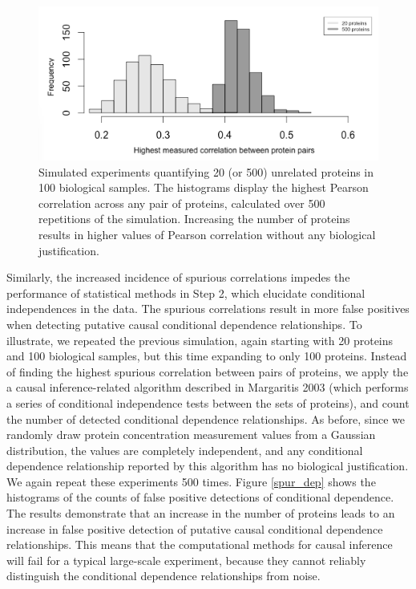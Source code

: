\documentclass[journal=jacsat,manuscript=article]{achemso}
\begin{document}
\begin{figure}[!tpb]
\centerline{\includegraphics[width=1\textwidth]{figs/spurious_corr.png}}
\caption{Simulated experiments quantifying 20 (or 500) unrelated proteins in 100 biological samples. The histograms display the highest Pearson correlation across any pair of proteins, calculated over 500 repetitions of the simulation. Increasing the number of proteins results in higher values of Pearson correlation without any biological justification.}
\label{spur_corr}
\end{figure}

Similarly, the increased incidence of spurious correlations impedes the performance of statistical methods in Step 2, which elucidate conditional independences in the data.  The spurious correlations result in more false positives when detecting putative causal conditional dependence relationships. To illustrate, we repeated the previous simulation, again starting with 20 proteins and 100 biological samples, but this time expanding to only 100 proteins.  Instead of finding the highest  spurious correlation between pairs of proteins, we apply the a causal inference-related algorithm described in Margaritis 2003 \cite{margaritis2003learning} (which performs a series of conditional independence tests between the sets of proteins), and count the number of detected conditional dependence relationships.  As before, since we randomly draw protein concentration measurement values from a Gaussian distribution, the values are completely independent, and any conditional dependence relationship reported by this algorithm has no biological justification.  We again repeat these experiments 500 times. Figure \ref{spur_dep} shows the histograms of the counts of false positive detections of conditional dependence.  The results demonstrate that an increase in the number of proteins leads to an increase in false positive detection of putative causal conditional dependence relationships. This means that the computational methods for causal inference will fail for a typical large-scale experiment, because they cannot reliably distinguish the conditional dependence relationships from noise.
\end{document}
